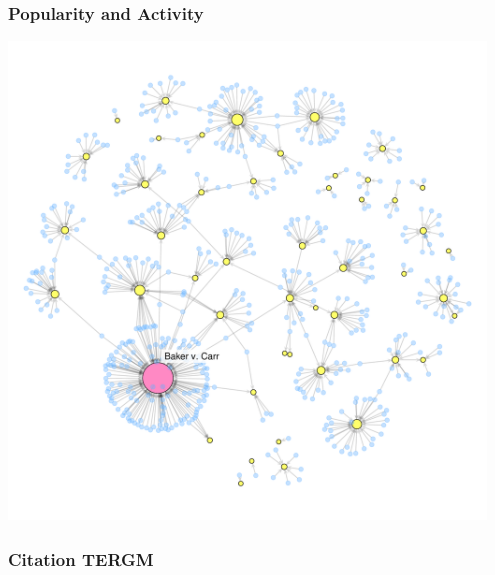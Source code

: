 \documentclass[handout]{beamer}
\begin{document}
\begin{frame} \frametitle{Popularity and Activity}

\centering

\includegraphics[width = 0.95\textwidth,trim= 0cm 3cm 6cm 8cm,clip=true ]{../../../NetworkVisualizations/citations_pop.pdf}


\end{frame}

\begin{frame} \frametitle{Citation TERGM}

\end{frame}
\end{document}
